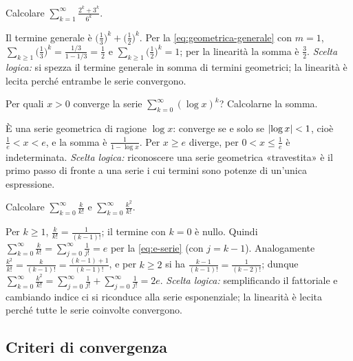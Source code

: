\begin{esercizio}
Calcolare $\displaystyle\sum_{k=1}^{\infty}\frac{2^{k}+3^{k}}{6^{k}}$.
\begin{soluzione}
Il termine generale è $\bigl(\frac13\bigr)^{k}+\bigl(\frac12\bigr)^{k}$. Per la \eqref{eq:geometrica-generale}
con $m=1$, $\sum_{k\ge1}\bigl(\frac13\bigr)^{k}=\frac{1/3}{1-1/3}=\frac12$ e $\sum_{k\ge1}\bigl(\frac12\bigr)^{k}=1$; per la linearità
la somma è $\frac32$. \emph{Scelta logica:} si spezza il termine generale in somma di termini
geometrici; la linearità è lecita perché entrambe le serie convergono.
\end{soluzione}
\end{esercizio}

\begin{esercizio}
Per quali $x>0$ converge la serie $\sum_{k=0}^{\infty}(\log x)^{k}$? Calcolarne la somma.
\begin{soluzione}
È una serie geometrica di ragione $\log x$: converge se e solo se $\lvert \log x\rvert<1$, cioè
$\frac1e<x<e$, e la somma è $\frac1{1-\log x}$. Per $x\ge e$ diverge, per $0<x\le\frac1e$ è indeterminata.
\emph{Scelta logica:} riconoscere una serie geometrica «travestita» è il primo passo di
fronte a una serie i cui termini sono potenze di un'unica espressione.
\end{soluzione}
\end{esercizio}

\begin{esercizio}
Calcolare $\displaystyle\sum_{k=0}^{\infty}\frac k{k!}$ e $\displaystyle\sum_{k=0}^{\infty}\frac{k^{2}}{k!}$.
\begin{soluzione}
Per $k\ge1$, $\frac k{k!}=\frac1{(k-1)!}$; il termine con $k=0$ è nullo. Quindi
$\sum_{k=0}^{\infty}\frac k{k!}=\sum_{j=0}^{\infty}\frac1{j!}=e$ per la \eqref{eq:e-serie} (con $j=k-1$). Analogamente
$\frac{k^{2}}{k!}=\frac k{(k-1)!}=\frac{(k-1)+1}{(k-1)!}$, e per $k\ge2$ si ha $\frac{k-1}{(k-1)!}=\frac1{(k-2)!}$; dunque
$\sum_{k=0}^{\infty}\frac{k^{2}}{k!}=\sum_{j=0}^{\infty}\frac1{j!}+\sum_{j=0}^{\infty}\frac1{j!}=2e$. \emph{Scelta logica:} semplificando il
fattoriale e cambiando indice ci si riconduce alla serie esponenziale; la linearità è
lecita perché tutte le serie coinvolte convergono.
\end{soluzione}
\end{esercizio}

\subsection*{Criteri di convergenza}

